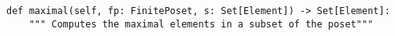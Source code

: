 \begin{verbatim}
def maximal(self, fp: FinitePoset, s: Set[Element]) -> Set[Element]:
    """ Computes the maximal elements in a subset of the poset"""
\end{verbatim}